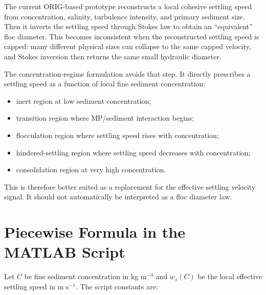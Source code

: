 \documentclass[11pt]{article}
\begin{document}
The current ORIG-based prototype reconstructs a local cohesive settling speed
from concentration, salinity, turbulence intensity, and primary sediment size.
Then it inverts the settling speed through Stokes law to obtain an
``equivalent'' floc diameter.  This becomes inconsistent when the reconstructed
settling speed is capped: many different physical sizes can collapse to the
same capped velocity, and Stokes inversion then returns the same small
hydraulic diameter.

The concentration-regime formulation avoids that step.  It directly prescribes
a settling speed as a function of local fine sediment concentration:
\begin{itemize}
  \item inert region at low sediment concentration;
  \item transition region where MP/sediment interaction begins;
  \item flocculation region where settling speed rises with concentration;
  \item hindered-settling region where settling speed decreases with
        concentration;
  \item consolidation region at very high concentration.
\end{itemize}

This is therefore better suited as a replacement for the effective settling
velocity signal.  It should not automatically be interpreted as a floc diameter
law.

\section*{Piecewise Formula in the MATLAB Script}

Let $C$ be fine sediment concentration in kg m$^{-3}$ and $w_s(C)$ be the
local effective settling speed in m s$^{-1}$.  The script constants are:
\end{document}
